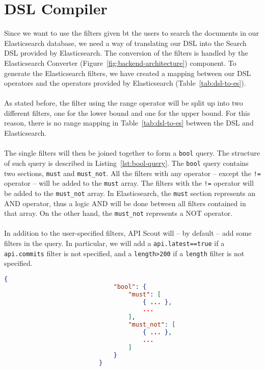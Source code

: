 \section{DSL Compiler}\label{sec:dsl-parser}
Since we want to use the filters given bt the users to search the documents in our Elasticsearch database, we need a way of translating our DSL into the Search DSL provided by Elasticsearch.
The conversion of the filters is handled by the Elasticsearch Converter (Figure~\ref{fig:backend-architecture}) component.
To generate the Elasticsearch filters, we have created a mapping between our DSL operators and the operators provided by Elasticsearch (Table~\ref{tab:dsl-to-es}). \\ \\
As stated before, the filter using the range operator will be split up into two different filters, one for the lower bound and one for the upper bound.
For this reason, there is no range mapping in Table~\ref{tab:dsl-to-es} between the DSL and Elasticsearch. \\ \\
The single filters will then be joined together to form a \verb|bool| query.
The structure of such query is described in Listing~\ref{lst:bool-query}.
The \verb|bool| query contains two sections, \verb|must| and \verb|must_not|.
All the filters with any operator -- except the \verb|!=| operator -- will be added to the \verb|must| array.
The filters with the \verb|!=| operator will be added to the \verb|must_not| array.
In Elasticsearch, the \verb|must| section represents an AND operator, thus a logic AND will be done between all filters contained in that array.
On the other hand, the \verb|must_not| represents a NOT operator. \\ \\
In addition to the user-specified filters, API Scout will -- by default -- add some filters in the query.
In particular, we will add a \verb|api.latest==true| if a \verb|api.commits| filter is not specified, and a \verb|length>200| if a \verb|length| filter is not specified.

\begin{center}
    \begin{lstlisting}[label={lst:bool-query},caption={Structure of an Elasticsearch bool query},captionpos=b,language=json]
                          {
                              "bool": {
                                  "must": [
                                      { ... },
                                      ...
                                  ],
                                  "must_not": [
                                      { ... },
                                      ...
                                  ]
                              }
                          }
    \end{lstlisting}
\end{center}

